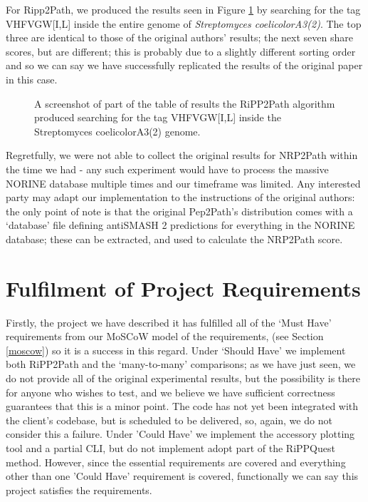\documentclass{l4proj}
\begin{document}
For Ripp2Path, we produced the results seen in Figure \ref{fig:ripp2path} by searching for the tag VHFVGW[I,L] inside the entire genome of \textit{Streptomyces coelicolorA3(2)}. The top three are identical to those of the original authors' results; the next seven share scores, but are different; this is probably due to a slightly different sorting order and so we can say we have successfully replicated the results of the original paper in this case.

\begin{figure} \label{fig:ripp2path}
    \centering

    \caption{A screenshot of part of the  table of results the RiPP2Path algorithm produced searching for the tag VHFVGW[I,L] inside the Streptomyces coelicolorA3(2) genome.}

    \label{fig:ripp2path}
\end{figure}

Regretfully, we were not able to collect the original results for NRP2Path within the time we had - any such experiment would have to process the massive NORINE database multiple times and our timeframe was limited. Any interested party may adapt our implementation to the instructions of the original authors: the only point of note is that the original Pep2Path's distribution comes with a `database' file defining antiSMASH 2 predictions for everything in the NORINE database; these can be extracted, and used to calculate the NRP2Path score. 

\section{Fulfilment of Project Requirements}

Firstly, the project we have described it has fulfilled all of the `Must Have' requirements from our MoSCoW model of the requirements, (see Section \ref{moscow}) so it is a success in this regard. Under `Should Have' we implement both RiPP2Path and the `many-to-many' comparisons; as we have just seen, we do not provide all of the original experimental results, but the possibility is there for anyone who wishes to test, and we believe we have sufficient correctness guarantees that this is a minor point. The code has not yet been integrated with the client's codebase, but is scheduled to be delivered, so, again, we do not consider this a failure. Under 'Could Have' we implement the accessory plotting tool and a partial CLI, but do not implement adopt part of the RiPPQuest method. However, since the essential requirements are covered and everything other than one 'Could Have' requirement is covered, functionally we can say this project satisfies the requirements.
\end{document}
